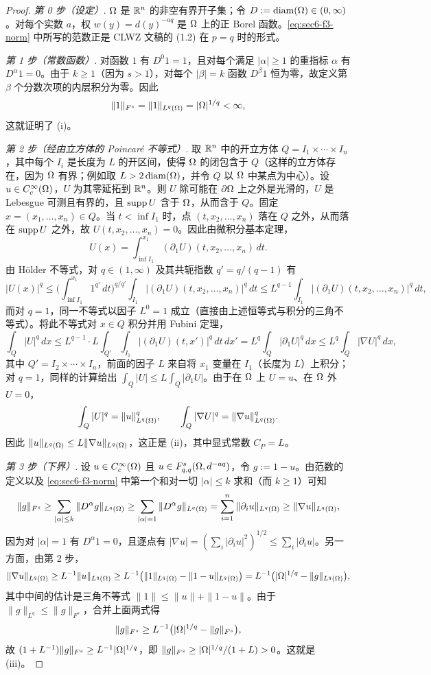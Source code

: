 \begin{proof}
\emph{第 0 步（设定）}. $\Omega$ 是 $\mathbb{R}^n$ 的非空有界开子集；令 $D:=\operatorname{diam}(\Omega)\in(0,\infty)$。对每个实数 $a$，权 $w(y)=d(y)^{-aq}$ 是 $\Omega$ 上的正 Borel 函数。\eqref{eq:sec6-f3-norm} 中所写的范数正是 CLWZ 文稿的 (1.2) 在 $p=q$ 时的形式。

\emph{第 1 步（常数函数）}. 对函数 $1$ 有 $D^0 1=1$，且对每个满足 $|\alpha|\ge1$ 的重指标 $\alpha$ 有 $D^\alpha 1=0$。由于 $k\ge1$（因为 $s>1$），对每个 $|\beta|=k$ 函数 $D^\beta 1$ 恒为零，故定义第 $\beta$ 个分数次项的内层积分为零。因此
\[
  \|1\|_{F^s}=\|1\|_{L^q(\Omega)}=|\Omega|^{1/q}<\infty,
\]
这就证明了 (i)。

\emph{第 2 步（经由立方体的 Poincar\'e 不等式）}. 取 $\mathbb{R}^n$ 中的开立方体 $Q=I_1\times\cdots\times I_n$，其中每个 $I_i$ 是长度为 $L$ 的开区间，使得 $\Omega$ 的闭包含于 $Q$（这样的立方体存在，因为 $\Omega$ 有界；例如取 $L>2\operatorname{diam}(\Omega)$，并令 $Q$ 以 $\Omega$ 中某点为中心）。设 $u\in C_c^\infty(\Omega)$，$U$ 为其零延拓到 $\mathbb{R}^n$。则 $U$ 除可能在 $\partial\Omega$ 上之外是光滑的，$U$ 是 Lebesgue 可测且有界的，且 $\operatorname{supp} U$ 含于 $\Omega$，从而含于 $Q$。固定 $x=(x_1,\dots,x_n)\in Q$。当 $t<\inf I_1$ 时，点 $(t,x_2,\dots,x_n)$ 落在 $Q$ 之外，从而落在 $\operatorname{supp} U$ 之外，故 $U(t,x_2,\dots,x_n)=0$。因此由微积分基本定理，
\[
  U(x)=\int_{\inf I_1}^{x_1}(\partial_1U)(t,x_2,\dots,x_n)\,dt.
\]
由 H\"older 不等式，对 $q\in(1,\infty)$ 及其共轭指数 $q'=q/(q-1)$ 有
\[
  |U(x)|^q\le\Big(\int_{\inf I_1}^{x_1}1^{q'}\,dt\Big)^{q/q'}\int_{I_1}|(\partial_1U)(t,x_2,\dots,x_n)|^q\,dt
  \le L^{q-1}\int_{I_1}|(\partial_1U)(t,x_2,\dots,x_n)|^q\,dt,
\]
而对 $q=1$，同一不等式以因子 $L^0=1$ 成立（直接由上述恒等式与积分的三角不等式）。将此不等式对 $x\in Q$ 积分并用 Fubini 定理，
\[
  \int_Q|U|^q\,dx\le L^{q-1}\cdot L\int_{Q'}\int_{I_1}|(\partial_1U)(t,x')|^q\,dt\,dx'
  =L^q\int_Q|\partial_1U|^q\,dx\le L^q\int_Q|\nabla U|^q\,dx,
\]
其中 $Q'=I_2\times\cdots\times I_n$，前面的因子 $L$ 来自将 $x_1$ 变量在 $I_1$（长度为 $L$）上积分；对 $q=1$，同样的计算给出 $\int_Q|U|\le L\int_Q|\partial_1U|$。由于在 $\Omega$ 上 $U=u$、在 $\Omega$ 外 $U=0$，
\[
  \int_Q|U|^q=\|u\|^q_{L^q(\Omega)},\qquad \int_Q|\nabla U|^q=\|\nabla u\|^q_{L^q(\Omega)}.
\]
因此 $\|u\|_{L^q(\Omega)}\le L\|\nabla u\|_{L^q(\Omega)}$，这正是 (ii)，其中显式常数 $C_P=L$。

\emph{第 3 步（下界）}. 设 $u\in C_c^\infty(\Omega)$ 且 $u\in F^{s}_{q,q}(\Omega,d^{-aq})$，令 $g:=1-u$。由范数的定义以及 \eqref{eq:sec6-f3-norm} 中第一个和对一切 $|\alpha|\le k$ 求和（而 $k\ge1$）可知
\[
  \|g\|_{F^s}\ge\sum_{|\alpha|\le k}\|D^\alpha g\|_{L^q(\Omega)}
  \ge\sum_{|\alpha|=1}\|D^\alpha g\|_{L^q(\Omega)}
  =\sum_{i=1}^n\|\partial_i u\|_{L^q(\Omega)}\ge\|\nabla u\|_{L^q(\Omega)},
\]
因为对 $|\alpha|=1$ 有 $D^\alpha 1=0$，且逐点有 $|\nabla u|=(\sum_i|\partial_i u|^2)^{1/2}\le\sum_i|\partial_i u|$。另一方面，由第 2 步，
\[
  \|\nabla u\|_{L^q(\Omega)}\ge L^{-1}\|u\|_{L^q(\Omega)}
  \ge L^{-1}\big(\|1\|_{L^q(\Omega)}-\|1-u\|_{L^q(\Omega)}\big)
  =L^{-1}\big(|\Omega|^{1/q}-\|g\|_{L^q(\Omega)}\big),
\]
其中中间的估计是三角不等式 $\|1\|\le\|u\|+\|1-u\|$。由于 $\|g\|_{L^q}\le\|g\|_{F^s}$，合并上面两式得
\[
  \|g\|_{F^s}\ge L^{-1}\big(|\Omega|^{1/q}-\|g\|_{F^s}\big),
\]
故 $(1+L^{-1})\|g\|_{F^s}\ge L^{-1}|\Omega|^{1/q}$，即 $\|g\|_{F^s}\ge|\Omega|^{1/q}/(1+L)>0$。这就是 (iii)。


\end{proof}
